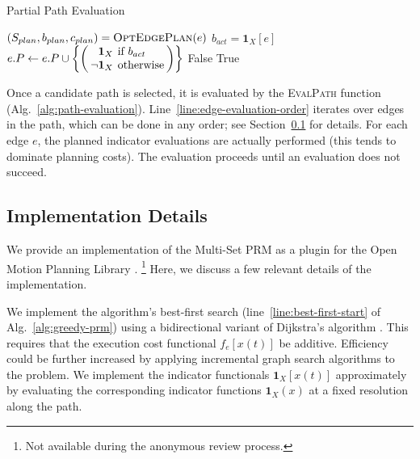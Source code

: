 \documentclass{report}
\begin{document}
\begin{algorithm}
\caption{Partial Path Evaluation}
\label{alg:path-evaluation}
\begin{algorithmic}[1]
         \label{line:edge-evaluation-order}
      \State $(S_{plan}, b_{plan}, c_{plan})
         = \mbox{\textsc{OptEdgePlan}}(e)$
         \State $b_{act} = \mathbf{1}_X[e]$
         \State $\arraycolsep=2pt
            e.P \leftarrow e.P \cup
            \left\{\left( \begin{array}{rl}
            \mathbf{1}_X & \mbox{if } b_{act} \\
            \lnot \mathbf{1}_X & \mbox{otherwise} \\
            \end{array} \right)
            \right\}$
            \State \Return False
         \EndIf
      \EndFor
   \EndFor
   \State \Return True
\EndFunction
\end{algorithmic}
\end{algorithm}

Once a candidate path is selected,
it is evaluated by the \textsc{EvalPath} function
(Alg.~\ref{alg:path-evaluation}).
Line~\ref{line:edge-evaluation-order} iterates over edges in
the path,
which can be done in any order;
see Section~\ref{subsec:implementation-details} for details.
For each edge $e$,
the planned indicator evaluations are actually performed
(this tends to dominate planning costs).
The evaluation proceeds until an evaluation does not succeed.

\subsection{Implementation Details}
\label{subsec:implementation-details}

We provide an implementation of the Multi-Set PRM
as a plugin for the Open Motion Planning Library \cite{sucan2012ompl}.%
\footnote{Not available during the anonymous review process.}
Here, we discuss a few relevant details of the implementation.

We implement the algorithm's best-first search 
(line~\ref{line:best-first-start} of Alg.~\ref{alg:greedy-prm})
using a bidirectional variant of Dijkstra's algorithm
\cite{dijkstra1959anote}.
This requires that the execution cost functional $f_e[x(t)]$
be additive.
Efficiency could be further increased by applying incremental
graph search algorithms \cite{koenig2004lpastar} to the problem.
We implement the indicator functionals $\mathbf{1}_X[x(t)]$
approximately by evaluating the corresponding indicator functions
$\mathbf{1}_X(x)$ at a fixed resolution along the path.
\end{document}
